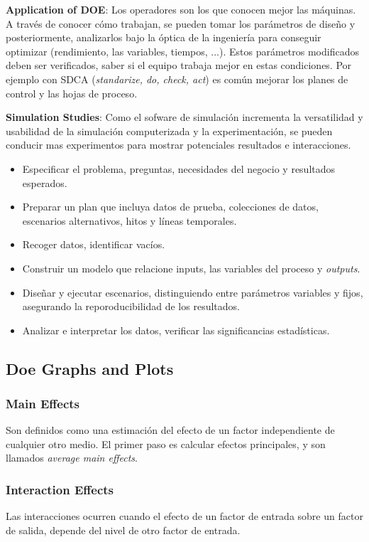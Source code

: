 \documentclass[]{article}
\begin{document}
\textbf{Application of DOE}: Los operadores son los que conocen mejor las máquinas. A través de conocer cómo trabajan, se pueden tomar los parámetros de diseño y posteriormente, analizarlos bajo la óptica de la ingeniería para conseguir optimizar (rendimiento, las variables, tiempos, ...). Estos parámetros modificados deben ser verificados, saber si el equipo trabaja mejor en estas condiciones. Por ejemplo con SDCA (\textit{standarize, do, check, act}) es común mejorar los planes de control y las hojas de proceso.

\textbf{Simulation Studies}: Como el sofware de simulación incrementa la versatilidad y usabilidad de la simulación computerizada y la experimentación, se pueden conducir mas experimentos para mostrar potenciales resultados e interacciones. 

\begin{itemize}
	\item Especificar el problema, preguntas, necesidades del negocio y resultados esperados.
	\item Preparar un plan que incluya datos de prueba, colecciones de datos, escenarios alternativos, hitos y líneas temporales.
	\item Recoger datos, identificar vacíos.
	\item Construir un modelo que relacione inputs, las variables del proceso y \textit{outputs}.
	\item Diseñar y ejecutar escenarios, distinguiendo entre parámetros variables y fijos, asegurando la reporoducibilidad de los resultados.
	\item Analizar e interpretar los datos, verificar las significancias estadísticas.
\end{itemize}

\subsection{Doe Graphs and Plots}
\subsubsection{Main Effects}
Son definidos como una estimación del efecto de un factor independiente de cualquier otro medio. El primer paso es calcular efectos principales, y son llamados \textit{average main effects}.

\subsubsection{Interaction Effects}
Las interacciones ocurren cuando el efecto de un factor de entrada sobre un factor de salida, depende del nivel de otro factor de entrada.
\end{document}
